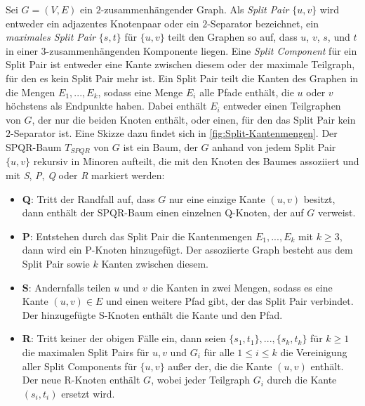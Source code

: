 \begin{definition}
  Sei $G = (V, E)$ ein $2$-zusammenhängender Graph.
  Als \emph{Split Pair} $\{u, v\}$ wird entweder ein adjazentes Knotenpaar oder ein $2$-Separator bezeichnet, ein \emph{maximales Split Pair} $\{s, t\}$ für $\{u, v\}$ teilt den Graphen so auf, dass $u$, $v$, $s$, und $t$ in einer $3$-zusammenhängenden Komponente liegen.
  Eine \emph{Split Component} für ein Split Pair ist entweder eine Kante zwischen diesem oder der maximale Teilgraph, für den es kein Split Pair mehr ist.
  Ein Split Pair teilt die Kanten des Graphen in die Mengen $E_1, ..., E_k$, sodass eine Menge $E_i$ alle Pfade enthält, die $u$ oder $v$ höchstens als Endpunkte haben.
  Dabei enthält $E_i$ entweder einen Teilgraphen von $G$, der nur die beiden Knoten enthält, oder einen, für den das Split Pair kein $2$-Separator ist.
  Eine Skizze dazu findet sich in \Abb \ref{fig:Split-Kantenmengen}.
  Der SPQR-Baum $T_{SPQR}$ von $G$ ist ein Baum, der $G$ anhand von jedem Split Pair $\{u, v\}$ rekursiv in Minoren aufteilt, die mit den Knoten des Baumes assoziiert und mit \emph{S}, \emph{P}, \emph{Q} oder \emph{R} markiert werden:
  \begin{itemize}
    \item \textbf{Q}: Tritt der Randfall auf, dass $G$ nur eine einzige Kante $(u, v)$ besitzt, dann enthält der SPQR-Baum einen einzelnen Q-Knoten, der auf $G$ verweist.
    \item \textbf{P}: Entstehen durch das Split Pair die Kantenmengen $E_1, ..., E_k$ mit $k \geq 3$, dann wird ein P-Knoten hinzugefügt.
                      Der assoziierte Graph besteht aus dem Split Pair sowie $k$ Kanten zwischen diesem.
    \item \textbf{S}: Andernfalls teilen $u$ und $v$ die Kanten in zwei Mengen, sodass es eine Kante $(u, v) \in E$ und einen weitere Pfad gibt, der das Split Pair verbindet.
                      Der hinzugefügte S-Knoten enthält die Kante und den Pfad.
    \item \textbf{R}: Tritt keiner der obigen Fälle ein, dann seien $\{s_1, t_1\}, ..., \{s_k, t_k\}$ für $k \geq 1$ die maximalen Split Pairs für ${u, v}$ und $G_i$ für alle $1 \leq i \leq k$ die Vereinigung aller Split Components für $\{u, v\}$ außer der, die die Kante $(u, v)$ enthält.
                      Der neue R-Knoten enthält $G$, wobei jeder Teilgraph $G_i$ durch die Kante $(s_i, t_i)$ ersetzt wird.
  \end{itemize}
\end{definition}

